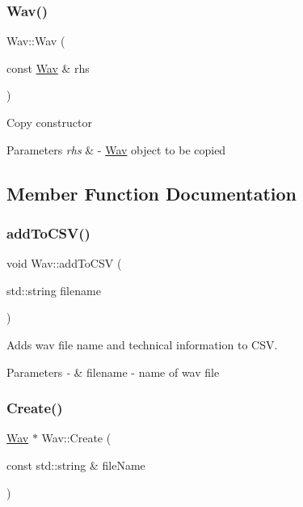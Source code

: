 \subsubsection{\texorpdfstring{Wav()}{Wav()}\hspace{0.1cm}{\footnotesize\ttfamily [2/2]}}
{\footnotesize\ttfamily Wav\+::\+Wav (\begin{DoxyParamCaption}\item[{const \hyperlink{classWav}{Wav} \&}]{rhs }\end{DoxyParamCaption})}

Copy constructor


\begin{DoxyParams}{Parameters}
{\em rhs} & -\/ \hyperlink{classWav}{Wav} object to be copied \\
\hline
\end{DoxyParams}


\subsection{Member Function Documentation}
\mbox{\label{classWav_a6e5d91d38497df976e0ec5d9d391e8e5}} 
\subsubsection{\texorpdfstring{add\+To\+C\+S\+V()}{addToCSV()}}
{\footnotesize\ttfamily void Wav\+::add\+To\+C\+SV (\begin{DoxyParamCaption}\item[{std\+::string}]{filename }\end{DoxyParamCaption})}

Adds wav file name and technical information to C\+SV.


\begin{DoxyParams}{Parameters}
{\em -\/} & filename -\/ name of wav file \\
\hline
\end{DoxyParams}
\mbox{\label{classWav_a3f742b0d3f1334a9be65ef264711d34f}} 
\subsubsection{\texorpdfstring{Create()}{Create()}}
{\footnotesize\ttfamily \hyperlink{classWav}{Wav} $\ast$ Wav\+::\+Create (\begin{DoxyParamCaption}\item[{const std\+::string \&}]{file\+Name }\end{DoxyParamCaption})\hspace{0.3cm}{\ttfamily [static]}}

